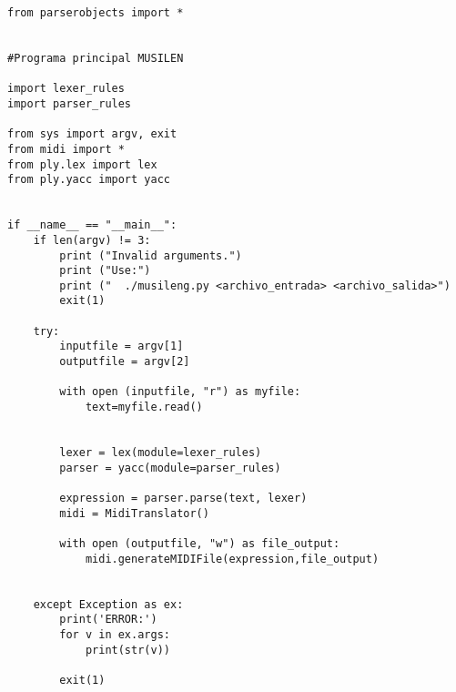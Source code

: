 \begin{verbatim}
from parserobjects import *


#Programa principal MUSILEN

import lexer_rules
import parser_rules

from sys import argv, exit
from midi import *
from ply.lex import lex
from ply.yacc import yacc


if __name__ == "__main__":
    if len(argv) != 3:
        print ("Invalid arguments.")
        print ("Use:")
        print ("  ./musileng.py <archivo_entrada> <archivo_salida>")
        exit(1)

    try:
        inputfile = argv[1]
        outputfile = argv[2]

        with open (inputfile, "r") as myfile:
            text=myfile.read()


        lexer = lex(module=lexer_rules)
        parser = yacc(module=parser_rules)

        expression = parser.parse(text, lexer)
        midi = MidiTranslator()

        with open (outputfile, "w") as file_output:
            midi.generateMIDIFile(expression,file_output)


    except Exception as ex:
        print('ERROR:')
        for v in ex.args:
            print(str(v))

        exit(1)
\end{verbatim}

